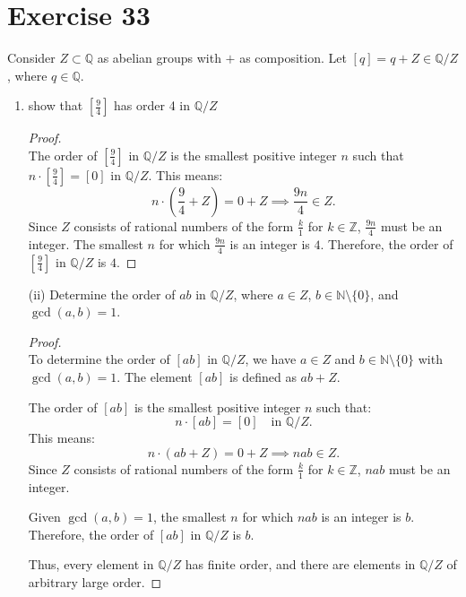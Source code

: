 \documentclass{article}
\begin{document}
\section*{Exercise 33}
Consider \( Z \subset \mathbb{Q} \) as abelian groups with \( + \) as composition. Let \( [q] = q + Z \in \mathbb{Q}/Z \), where \( q \in \mathbb{Q} \).

\begin{enumerate}
    \item show that $[\frac{9}{4}]$ has order 4 in $\mathbb{Q}/Z$
    \begin{proof}
        \leavevmode \\
        The order of $[\frac{9}{4}]$ in $\mathbb{Q}/Z$ is the smallest positive integer $n$ such that $n \cdot [\frac{9}{4}] = [0]$ in $\mathbb{Q}/Z$. This means:
        \[
        n \cdot \left( \frac{9}{4} + Z \right) = 0 + Z \implies \frac{9n}{4} \in Z.
        \]
        Since $Z$ consists of rational numbers of the form $\frac{k}{1}$ for $k \in \mathbb{Z}$, $\frac{9n}{4}$ must be an integer. The smallest $n$ for which $\frac{9n}{4}$ is an integer is $4$. Therefore, the order of $[\frac{9}{4}]$ in $\mathbb{Q}/Z$ is $4$.
    \end{proof}
    \item[(ii)] Determine the order of \( ab \) in \( \mathbb{Q}/Z \), where \( a \in Z \), \( b \in \mathbb{N} \setminus \{0\} \), and \( \gcd(a, b) = 1 \).
    \begin{proof} \leavevmode \\
        To determine the order of \( [ab] \) in \( \mathbb{Q}/Z \), we have \( a \in Z \) and \( b \in \mathbb{N} \setminus \{0\} \) with \( \gcd(a, b) = 1 \). The element \( [ab] \) is defined as \( ab + Z \).

    The order of \( [ab] \) is the smallest positive integer \( n \) such that:
    \[
    n \cdot [ab] = [0] \quad \text{in } \mathbb{Q}/Z.
    \]
    This means:
    \[
    n \cdot (ab + Z) = 0 + Z \implies nab \in Z.
    \]
    Since \( Z \) consists of rational numbers of the form \( \frac{k}{1} \) for \( k \in \mathbb{Z} \), \( nab \) must be an integer.

    Given \( \gcd(a, b) = 1 \), the smallest \( n \) for which \( nab \) is an integer is \( b \). Therefore, the order of \( [ab] \) in \( \mathbb{Q}/Z \) is \( b \).

    Thus, every element in \( \mathbb{Q}/Z \) has finite order, and there are elements in \( \mathbb{Q}/Z \) of arbitrary large order.


\end{proof}
\end{enumerate}
\end{document}
